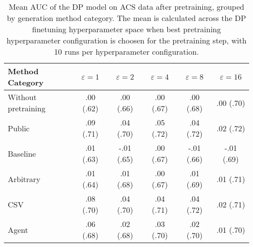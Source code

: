 \begin{table}[h!]
    \centering
    \caption{Mean AUC of the DP model on ACS data after pretraining, grouped by generation method category. The mean is calculated across the DP finetuning hyperparameter space when best pretraining hyperparameter configuration is choosen for the pretraining step, with 10 runs per hyperparameter configuration.}
    \label{tab:epsilon_comparison}
    \begin{tabular}{lccccc}
    \toprule
    Method Category & $\varepsilon=1$ & $\varepsilon=2$ & $\varepsilon=4$ & $\varepsilon=8$ & $\varepsilon=16$ \\
    \midrule
    Without pretraining & .00 {\small (.62)} & .00 {\small (.66)} & .00 {\small (.67)} & .00 {\small (.68)} & .00 {\small (.70)} \\
    \arrayrulecolor{black!50!}\midrule
    Public & \cellcolor{gold!30}.09 {\small (.71)} & \cellcolor{gold!30}.04 {\small (.70)} & \cellcolor{gold!30}.05 {\small (.72)} & \cellcolor{gold!30}.04 {\small (.72)} & \cellcolor{gold!30}.02 {\small (.72)} \\
    \arrayrulecolor{black!50!}\midrule
    Baseline & .01 {\small (.63)} & -.01 {\small (.65)} & .00 {\small (.67)} & -.01 {\small (.66)} & -.01 {\small (.69)} \\
    \arrayrulecolor{black!50!}\midrule
    Arbitrary & .01 {\small (.64)} & .01 {\small (.68)} & .00 {\small (.67)} & .01 {\small (.69)} & \cellcolor{bronze!30}.01 {\small (.71)} \\
    \arrayrulecolor{black!50!}\midrule
    CSV & \cellcolor{silver!30}.08 {\small (.70)} & \cellcolor{silver!30}.04 {\small (.70)} & \cellcolor{silver!30}.04 {\small (.71)} & \cellcolor{silver!30}.04 {\small (.72)} & \cellcolor{silver!30}.02 {\small (.71)} \\
    Agent & \cellcolor{bronze!30}.06 {\small (.68)} & \cellcolor{bronze!30}.02 {\small (.68)} & \cellcolor{bronze!30}.03 {\small (.70)} & \cellcolor{bronze!30}.02 {\small (.70)} & .01 {\small (.70)} \\
    \bottomrule
    \end{tabular}
\end{table}